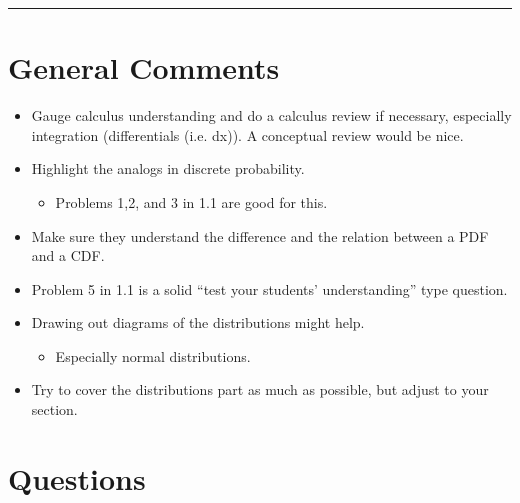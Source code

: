 \documentclass{exam}
\title{}
\date{Markov Chains, Continuous Probability, Conditional Expectation}
\begin{document}
\maketitle
\rule{\textwidth}{0.15em}
\fontsize{12}{15}\selectfont
\thispagestyle{empty}


\section{General Comments}
\begin{itemize}
\item Gauge calculus understanding and do a calculus review if necessary, 
especially integration (differentials (i.e. dx)). A conceptual
review would be nice. 
\item Highlight the analogs in discrete probability. 
\begin{itemize}
\item Problems 1,2, and 3 in 1.1 are good for this. 
\end{itemize}
\item Make sure they understand the difference and the relation between 
a PDF and a CDF.
\item Problem 5 in 1.1 is a solid ``test your students' understanding'' type question. 
\item Drawing out diagrams of the distributions might help.
\begin{itemize}
\item Especially normal distributions.
\end{itemize}
\item Try to cover the distributions part as much as possible, but adjust to your section. 
\end{itemize}
\section{Questions}
\end{document}

